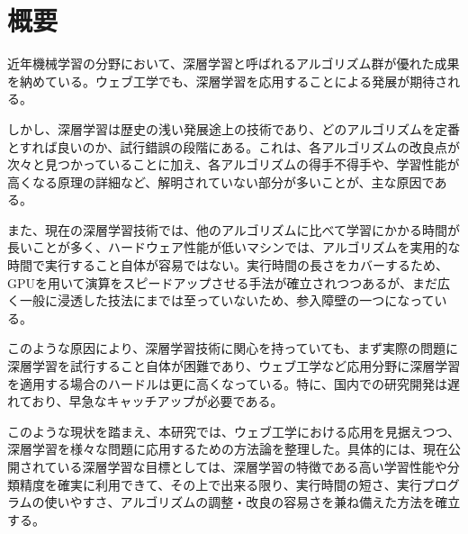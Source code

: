 \chapter*{概要}
近年機械学習の分野において、深層学習と呼ばれるアルゴリズム群が優れた成果を納めている。ウェブ工学でも、深層学習を応用することによる発展が期待される。\par
しかし、深層学習は歴史の浅い発展途上の技術であり、どのアルゴリズムを定番とすれば良いのか、試行錯誤の段階にある。これは、各アルゴリズムの改良点が次々と見つかっていることに加え、各アルゴリズムの得手不得手や、学習性能が高くなる原理の詳細など、解明されていない部分が多いことが、主な原因である。\par
また、現在の深層学習技術では、他のアルゴリズムに比べて学習にかかる時間が長いことが多く、ハードウェア性能が低いマシンでは、アルゴリズムを実用的な時間で実行すること自体が容易ではない。実行時間の長さをカバーするため、GPUを用いて演算をスピードアップさせる手法が確立されつつあるが、まだ広く一般に浸透した技法にまでは至っていないため、参入障壁の一つになっている。\par
このような原因により、深層学習技術に関心を持っていても、まず実際の問題に深層学習を試行すること自体が困難であり、ウェブ工学など応用分野に深層学習を適用する場合のハードルは更に高くなっている。特に、国内での研究開発は遅れており、早急なキャッチアップが必要である。\par
このような現状を踏まえ、本研究では、ウェブ工学における応用を見据えつつ、深層学習を様々な問題に応用するための方法論を整理した。具体的には、現在公開されている深層学習な目標としては、深層学習の特徴である高い学習性能や分類精度を確実に利用できて、その上で出来る限り、実行時間の短さ、実行プログラムの使いやすさ、アルゴリズムの調整・改良の容易さを兼ね備えた方法を確立する。

\begin{comment}このような原因により、深層学習技術に関心を持っていても、まず実際の問題に深層学習を試行すること自体が困難であり、応用技術開発のハードルは更に高くなっている。アルゴリズムが開発途上で確定できていないため、公開されているライブラリも、現状では、開発用途や実験的なものが多くなってしまっている。そもそも有力なアルゴリズムに対応する実装が用意されていない場合や、問題に応じて自らアルゴリズムの細部を調整しなければならない場合もある。ライブラリがGPU専用に書かれていることが徒となり、GPUを持っていないと実行自体ができなくなることも考えられる。例え実行するところまで到達できたとしても、提供されているのがアルゴリズムのダイジェスト版でしかなく、論文にて示されている精度を手元で再現することが出来ない場合も多い。標準と言える公開ライブラリが確立していない状況なので、ウェブ工学など応用分野に深層学習を適用したいと考えても、プログラム開発に長い時間がかかってしまい、開発における大きな障壁となっている。特に、国内での研究開発は遅れており、早急なキャッチアップが必要である。
\end{comment}
